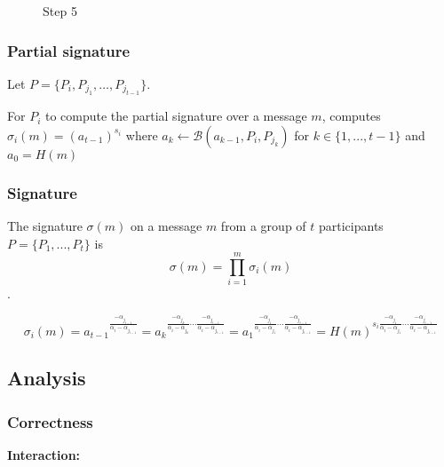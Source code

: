 \begin{figure}
        \begin{center}
        \end{center}
\caption{Step 5}
\end{figure}

\subsubsection*{Partial signature}
Let $P = \{P_i, P_{j_1}, \dots , P_{j_{t-1}} \}$.

For $P_i$ to compute the partial signature over a message $m$, computes $\sigma_i(m) = (a_{t-1})^{s_i}$ where $a_k \leftarrow \mathcal{B}(a_{k-1},P_i,P_{j_k})$ for $k \in \{1, ... , t-1 \}$ and $a_0 = H(m)$

\subsubsection*{Signature}
The signature $\sigma(m)$ on a message $m$ from a group of $t$ participants $P = \{P_1, ... , P_t \}$ is
$$\sigma(m) = \prod_{i=1}^m \sigma_i(m)$$.

$$
\sigma_i (m)
= a_{t-1} {}^{\frac{- \alpha_{j_{t-1}}}{\alpha_{i} - \alpha_{j_{t-1}}}}
= a_k {}^{\frac{- \alpha_{j_{k}}}{\alpha_{i} - \alpha_{j_{k}}} \cdots \frac{- \alpha_{j_{t-1}}}{\alpha_{i} - \alpha_{j_{t-1}}}}
= a_1 {}^{\frac{- \alpha_{j_{1}}}{\alpha_{i} - \alpha_{j_{1}}} \cdots \frac{- \alpha_{j_{t-1}}}{\alpha_{i} - \alpha_{j_{t-1}}}}
= H(m)^{ s_i \frac{- \alpha_{j_{1}}}{\alpha_{i} - \alpha_{j_{1}}} \cdots \frac{- \alpha_{j_{t-1}}}{\alpha_{i} - \alpha_{j_{t-1}}}}
$$

\subsection{Analysis}
\subsubsection*{Correctness}
\textbf{Interaction:}
